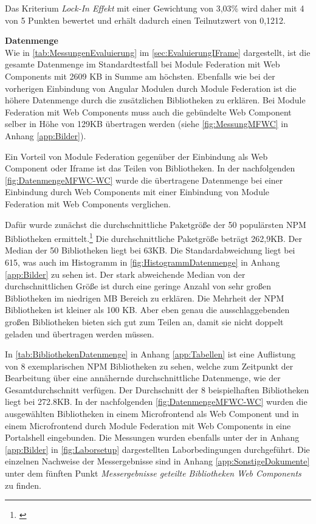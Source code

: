 Das Kriterium \textit{Lock-In Effekt} mit einer Gewichtung von 3,03\% wird daher mit 4 von 5 Punkten bewertet und erhält dadurch einen Teilnutzwert von 0,1212.

\textbf{Datenmenge}\\
Wie in \cref{tab:MessungenEvaluierung} im \cref{sec:EvaluierungIFrame} dargestellt, ist die gesamte Datenmenge im Standardtestfall bei Module Federation mit Web Components mit 2609 KB in Summe am höchsten. Ebenfalls wie bei der vorherigen Einbindung von Angular Modulen durch Module Federation ist die höhere Datenmenge durch die zusätzlichen Bibliotheken zu erklären. Bei Module Federation mit Web Components muss auch die gebündelte Web Component selber in Höhe von 129KB übertragen werden (siehe \cref{fig:MessungMFWC} in Anhang \ref{app:Bilder}).

Ein Vorteil von Module Federation gegenüber der Einbindung als Web Component oder Iframe ist das Teilen von Bibliotheken. In der nachfolgenden \cref{fig:DatenmengeMFWC-WC} wurde die übertragene Datenmenge bei einer Einbindung durch Web Components mit einer Einbindung von Module Federation mit Web Components verglichen.

Dafür wurde zunächst die durchschnittliche Paketgröße der 50 populärsten \gls{NPM} Bibliotheken ermittelt.\footnote{\cite[vgl.][]{Kashcha2019}} Die durchschnittliche Paketgröße beträgt 262,9\gls{KB}. Der Median der 50 Bibliotheken liegt bei 63\gls{KB}. Die Standardabweichung liegt bei 615, was auch im Histogramm in \cref{fig:HistogrammDatenmenge} in Anhang \ref{app:Bilder} zu sehen ist. Der stark abweichende Median von der durchschnittlichen Größe ist durch eine geringe Anzahl von sehr großen Bibliotheken im niedrigen \gls{MB} Bereich zu erklären. Die Mehrheit der \gls{NPM} Bibliotheken ist kleiner als 100 \gls{KB}. Aber eben genau die ausschlaggebenden großen Bibliotheken bieten sich gut zum Teilen an, damit sie nicht doppelt geladen und übertragen werden müssen.

In \cref{tab:BibliothekenDatenmenge} in Anhang \ref{app:Tabellen} ist eine Auflistung von 8 exemplarischen \gls{NPM} Bibliotheken zu sehen, welche zum Zeitpunkt der Bearbeitung über eine annähernde durchschnittliche Datenmenge, wie der Gesamtdurchschnitt verfügen. Der Durchschnitt der 8 beispielhaften Bibliotheken liegt bei 272.8\gls{KB}. In der nachfolgenden \cref{fig:DatenmengeMFWC-WC} wurden die ausgewählten Bibliotheken in einem Microfrontend als Web Component und in einem Microfrontend durch Module Federation mit Web Components in eine Portalshell eingebunden. Die Messungen wurden ebenfalls unter der in Anhang \ref{app:Bilder} in \cref{fig:Laborsetup} dargestellten Laborbedingungen durchgeführt. Die einzelnen Nachweise der Messergebnisse sind in Anhang \ref{app:SonstigeDokumente} unter dem fünften Punkt \textit{Messergebnisse geteilte Bibliotheken Web Components} zu finden.

